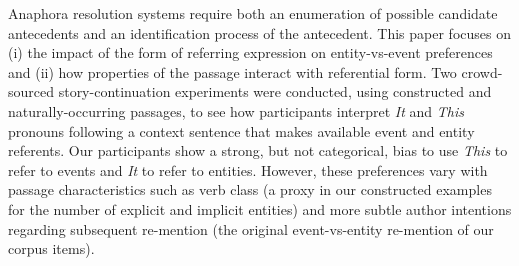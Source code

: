 Anaphora resolution systems require both an enumeration of possible candidate antecedents and an identification process of the antecedent.  This paper focuses on (i) the impact of the form of referring expression on entity-vs-event preferences and (ii) how properties of the passage interact with referential form. Two crowd-sourced story-continuation experiments were conducted, using constructed and naturally-occurring passages, to see how participants interpret \textit{It} and \textit{This} pronouns following a context sentence that makes available event and entity referents.  Our participants show a strong, but not categorical, bias to use \textit{This} to refer to events and \textit{It} to refer to entities.  However, these preferences vary with passage characteristics such as verb class (a proxy in our constructed examples for the number of explicit and implicit entities) and more subtle author intentions regarding subsequent re-mention (the original event-vs-entity re-mention of our corpus items).
